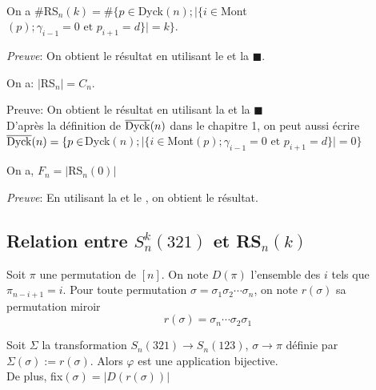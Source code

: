 \begin{corollaire}\label{SimNOfK} \text{ }\\
	On a $\#$\rm{RS}$_{n}(k) = \# \{p \in $\rm{Dyck}$(n); |\{i \in $\rm{Mont}$(p); \gamma_{i-1}=0 \text{ et } p_{i+1}=d\}|=k\}$.
\end{corollaire}
\textit{Preuve}: On obtient le résultat  en utilisant le  et la  $\blacksquare$.

\begin{corollaire}
	On a:  $|$\rm{RS}$_{n}|=C_{n}$.
\end{corollaire}
Preuve: On obtient le résultat en utilisant la  et la  $\blacksquare$\\
D'après la définition de  $\overline{\rm{Dyck}}(n)$ dans le chapitre 1,  on peut aussi écrire \\
$\overline{\rm{Dyck}}(n) = \{p \in $\rm{Dyck}$(n); |\{i \in $\rm{Mont}$(p); \gamma_{i-1}=0 \text{ et } p_{i+1}=d\}|=0\}$

\begin{corollaire} \label{fnToSRn0}
	\begin{rm}
		On a, $F_{n}=|$\rm{RS}$_{n}(0)|$
	\end{rm}
\end{corollaire}
\textit{Preuve}: En utilisant la  et le  , on obtient le résultat.


\subsection{Relation entre $S_{n}^{k}(321)$ et \rm{RS}$_{n}(k)$}
\begin{definition}
	\begin{rm}
		Soit $\pi$ une permutation de $[n]$. On note $D(\pi)$ l'ensemble des $i$ tels que $\pi_{n-i+1}=i$. Pour toute permutation $\sigma=\sigma_{1}\sigma_{2}\cdots \sigma_{n}$, on note $r(\sigma)$ sa permutation miroir $$r(\sigma)=\sigma_{n}\cdots \sigma_{2}\sigma_{1}$$
	\end{rm}
\end{definition}

\begin{proposition} \label{SKNBij}
	Soit $\Sigma$ la transformation $S_{n}(321)\longrightarrow S_{n}(123)$, $\sigma \longrightarrow \pi$ définie par  $\Sigma(\sigma):= r(\sigma)$. Alors $\varphi$ est une application bijective.\\
	De plus, \rm{fix}$(\sigma)=|D(r(\sigma))|$
\end{proposition}

